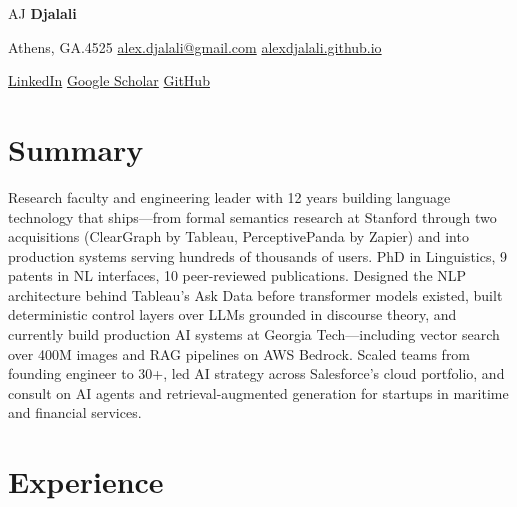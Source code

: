 \documentclass[9pt,letterpaper]{extarticle}
\newcommand{\cvsep}{\enspace\textcolor{ltgray}{\textperiodcentered}\enspace}
\begin{document}
\begin{center}
  {\fontsize{28pt}{32pt}\selectfont
    {\color{medgray}AJ}\enspace
    {\bfseries\color{navy}Djalali}%
  }\par
  \vspace{0.3em}
  {\small\color{medgray}
    Athens, GA\cvsep
    312.576.4525\cvsep
    \href{mailto:alex.djalali@gmail.com}{alex.djalali@gmail.com}\cvsep
    \href{https://alexdjalali.github.io}{alexdjalali.github.io}
  }\par\vspace{0.06em}
  {\small\color{medgray}
    \href{https://linkedin.com/in/alex-djalali-272502273}{LinkedIn}\cvsep
    \href{https://scholar.google.com/citations?user=nNk4g6oAAAAJ}{Google Scholar}\cvsep
    \href{https://github.com/alexdjalali}{GitHub}
  }
\end{center}

\vspace{-0.15em}

\section{Summary}

Research faculty and engineering leader with 12 years building language technology that ships---from formal semantics research at Stanford through two acquisitions (ClearGraph by Tableau, PerceptivePanda by Zapier) and into production systems serving hundreds of thousands of users. PhD in Linguistics, 9 patents in NL interfaces, 10 peer-reviewed publications. Designed the NLP architecture behind Tableau's Ask Data before transformer models existed, built deterministic control layers over LLMs grounded in discourse theory, and currently build production AI systems at Georgia Tech---including vector search over 400M images and RAG pipelines on AWS Bedrock. Scaled teams from founding engineer to 30+, led AI strategy across Salesforce's cloud portfolio, and consult on AI agents and retrieval-augmented generation for startups in maritime and financial services.

\section{Experience}
\end{document}
